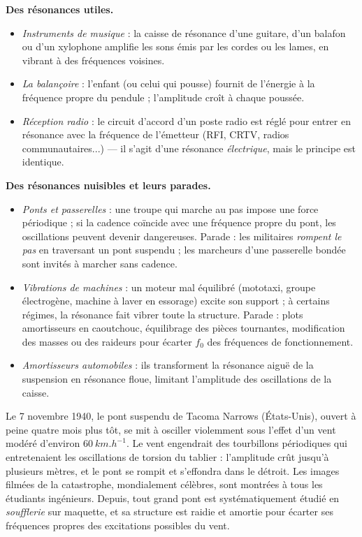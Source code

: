 \documentclass[11pt]{article}
\begin{document}
\textbf{Des résonances utiles.}\par

\begin{itemize}
\item \emph{Instruments de musique} : la caisse de résonance d'une guitare, d'un balafon ou d'un xylophone amplifie les sons émis par les cordes ou les lames, en vibrant à des fréquences voisines.
\item \emph{La balançoire} : l'enfant (ou celui qui pousse) fournit de l'énergie à la fréquence propre du pendule ; l'amplitude croît à chaque poussée.
\item \emph{Réception radio} : le circuit d'accord d'un poste radio est réglé pour entrer en résonance avec la fréquence de l'émetteur (RFI, CRTV, radios communautaires...) — il s'agit d'une résonance \emph{électrique}, mais le principe est identique.
\end{itemize}

\textbf{Des résonances nuisibles et leurs parades.}\par

\begin{itemize}
\item \emph{Ponts et passerelles} : une troupe qui marche au pas impose une force périodique ; si la cadence coïncide avec une fréquence propre du pont, les oscillations peuvent devenir dangereuses. Parade : les militaires \emph{rompent le pas} en traversant un pont suspendu ; les marcheurs d'une passerelle bondée sont invités à marcher sans cadence.
\item \emph{Vibrations de machines} : un moteur mal équilibré (mototaxi, groupe électrogène, machine à laver en essorage) excite son support ; à certains régimes, la résonance fait vibrer toute la structure. Parade : plots amortisseurs en caoutchouc, équilibrage des pièces tournantes, modification des masses ou des raideurs pour écarter $f_0$ des fréquences de fonctionnement.
\item \emph{Amortisseurs automobiles} : ils transforment la résonance aiguë de la suspension en résonance floue, limitant l'amplitude des oscillations de la caisse.
\end{itemize}

\begin{savaistu}
Le 7 novembre 1940, le pont suspendu de Tacoma Narrows (États-Unis), ouvert à peine quatre mois plus tôt, se mit à osciller violemment sous l'effet d'un vent modéré d'environ $\SI{60}{km.h^{-1}}$. Le vent engendrait des tourbillons périodiques qui entretenaient les oscillations de torsion du tablier : l'amplitude crût jusqu'à plusieurs mètres, et le pont se rompit et s'effondra dans le détroit. Les images filmées de la catastrophe, mondialement célèbres, sont montrées à tous les étudiants ingénieurs. Depuis, tout grand pont est systématiquement étudié en \emph{soufflerie} sur maquette, et sa structure est raidie et amortie pour écarter ses fréquences propres des excitations possibles du vent.
\end{savaistu}
\end{document}
